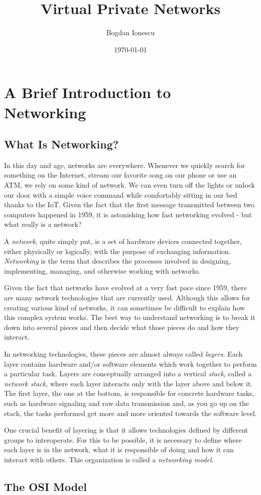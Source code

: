 \documentclass[a4paper,12pt]{report}
\begin{document}
	\title{Virtual Private Networks}
	\author{Bogdan Ionescu}
	\date{\today}
	\maketitle
	\tableofcontents
	
	\chapter{A Brief Introduction to Networking}
	\section{What Is Networking?}
		In this day and age, networks are everywhere. Whenever we quickly search for something on the Internet, stream our favorite song on our phone or use an ATM, we rely on some kind of network. We can even turn off the lights or unlock our door with a simple voice command while comfortably sitting in our bed thanks to the IoT. Given the fact that the first message transmitted between two computers happened in 1959, it is astonishing how fast networking evolved - but what really is a network? 

		A \textit{network}, quite simply put, is a set of hardware devices connected together, either physically or logically, with the purpose of exchanging information. \textit{Networking} is the term that describes the processes involved in designing, implementing, managing, and otherwise working with networks. 
		
		Given the fact that networks have evolved at a very fast pace since 1959, there are many network technologies that are currently used. Although this allows for creating various kind of networks, it can sometimes be difficult to explain how this complex system works. The best way to understand networking is to break it down into several pieces and then decide what those pieces do and how they interact.
		
		In networking technologies, these pieces are almost always called \textit{layers}. Each layer contains hardware and/or software elements which work together to perform a particular task. Layers are conceptually arranged into a vertical \textit{stack}, called a \textit{network stack}, where each layer interacts only with the layer above and below it. The first layer, the one at the bottom, is responsible for concrete hardware tasks, such as hardware signaling and raw data transmission and, as you go up on the stack, the tasks performed get more and more oriented towards the software level.
		
		One crucial benefit of layering is that it allows technologies defined by different groups to interoperate. For this to be possible, it is necessary to define where each layer is in the network, what it is responsible of doing and how it can interact with others. This organization is called a \textit{networking model}.
		
	\section{The OSI Model}
\end{document}
